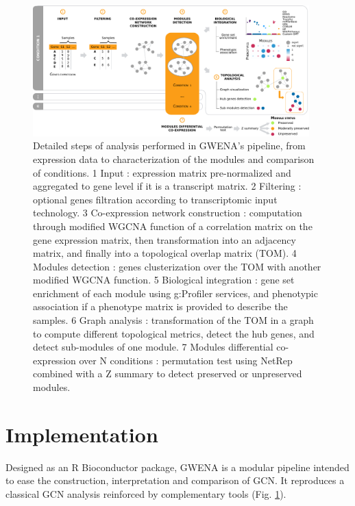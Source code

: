 \begin{figure}[ht]
    \centering
    \includegraphics[width=0.95\textwidth]{img/chap1/figure_1.pdf}
    \caption{Detailed steps of analysis performed in GWENA's pipeline, from expression data to characterization of the modules and comparison of conditions. \textcircled{\small{1}} Input : expression matrix pre-normalized and aggregated to gene level if it is a transcript matrix. \textcircled{\small{2}} Filtering : optional genes filtration according to transcriptomic input technology. \textcircled{\small{3}} Co-expression network construction : computation through modified WGCNA function of a correlation matrix on the gene expression matrix, then transformation into an adjacency matrix, and finally into a topological overlap matrix (TOM). \textcircled{\small{4}} Modules detection : genes clusterization over the TOM with another modified WGCNA function. \textcircled{\small{5}} Biological integration : gene set enrichment of each module using g:Profiler services, and phenotypic association if a phenotype matrix is provided to describe the samples. \textcircled{\small{6}} Graph analysis : transformation of the TOM in a graph to compute different topological metrics, detect the hub genes, and detect sub-modules of one module. \textcircled{\small{7}} Modules differential co-expression over N conditions : permutation test using NetRep combined with a Z summary to detect preserved or unpreserved modules.} 
    \label{fig:fig_pipeline_schema}
\end{figure}


\section{Implementation}

Designed as an R Bioconductor package, GWENA is a modular pipeline intended to ease the construction, interpretation and comparison of GCN. It reproduces a classical GCN analysis reinforced by complementary tools (Fig. \ref{fig:fig_pipeline_schema}). 


